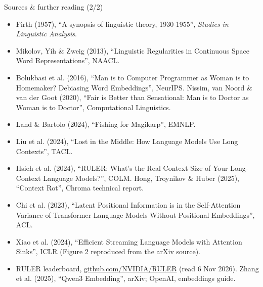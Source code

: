 \documentclass[aspectratio=169]{beamer}
\newcommand{\link}[2]{\href{#1}{\textcolor{popblue}{#2}}}   %
\begin{document}
\begin{frame}{Sources \& further reading (2/2)}
  \footnotesize
  \begin{itemize}
    \item Firth (1957), ``A synopsis of linguistic theory, 1930-1955'', \emph{Studies in
      Linguistic Analysis}.
    \item Mikolov, Yih \& Zweig (2013), ``Linguistic Regularities in Continuous Space Word
      Representations'', NAACL.
    \item Bolukbasi et al. (2016), ``Man is to Computer Programmer as Woman is to Homemaker?
      Debiasing Word Embeddings'', NeurIPS. Nissim, van Noord \& van der Goot (2020), ``Fair is
      Better than Sensational: Man is to Doctor as Woman is to Doctor'', Computational Linguistics.
    \item Land \& Bartolo (2024), ``Fishing for Magikarp'', EMNLP.
    \item Liu et al. (2024), ``Lost in the Middle: How Language Models Use Long Contexts'', TACL.
    \item Hsieh et al. (2024), ``RULER: What's the Real Context Size of Your Long-Context Language
      Models?'', COLM. Hong, Troynikov \& Huber (2025), ``Context Rot'', Chroma technical report.
    \item Chi et al. (2023), ``Latent Positional Information is in the Self-Attention Variance of
      Transformer Language Models Without Positional Embeddings'', ACL.
    \item Xiao et al. (2024), ``Efficient Streaming Language Models with Attention Sinks'', ICLR
      (Figure 2 reproduced from the arXiv source).
    \item RULER leaderboard, \link{https://github.com/NVIDIA/RULER}{github.com/NVIDIA/RULER} (read 6
      Nov 2026). Zhang et al. (2025), ``Qwen3 Embedding'', arXiv; OpenAI, embeddings guide.
  \end{itemize}
\end{frame}
\end{document}
